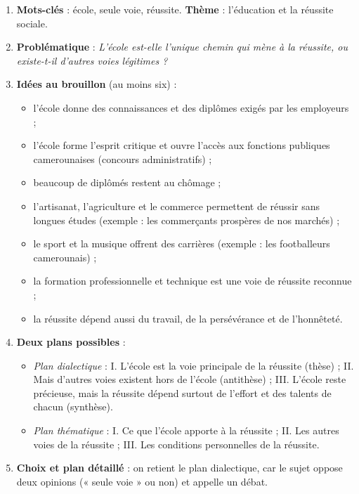 \documentclass[11pt]{article}
\newcommand{\cle}[1]{{\popxbold\color{popdark}#1}}
\begin{document}
\begin{corrige}
\begin{enumerate}
\item \textbf{Mots-clés} : \cle{école}, \cle{seule voie}, \cle{réussite}. \textbf{Thème} : l'éducation et la réussite sociale.
\item \textbf{Problématique} : \emph{L'école est-elle l'unique chemin qui mène à la réussite, ou existe-t-il d'autres voies légitimes ?}
\item \textbf{Idées au brouillon} (au moins six) :
\begin{itemize}
\item l'école donne des connaissances et des diplômes exigés par les employeurs ;
\item l'école forme l'esprit critique et ouvre l'accès aux fonctions publiques camerounaises (concours administratifs) ;
\item beaucoup de diplômés restent au chômage ;
\item l'artisanat, l'agriculture et le commerce permettent de réussir sans longues études (exemple : les commerçants prospères de nos marchés) ;
\item le sport et la musique offrent des carrières (exemple : les footballeurs camerounais) ;
\item la formation professionnelle et technique est une voie de réussite reconnue ;
\item la réussite dépend aussi du travail, de la persévérance et de l'honnêteté.
\end{itemize}
\item \textbf{Deux plans possibles} :
\begin{itemize}
\item \emph{Plan dialectique} : I. L'école est la voie principale de la réussite (thèse) ; II. Mais d'autres voies existent hors de l'école (antithèse) ; III. L'école reste précieuse, mais la réussite dépend surtout de l'effort et des talents de chacun (synthèse).
\item \emph{Plan thématique} : I. Ce que l'école apporte à la réussite ; II. Les autres voies de la réussite ; III. Les conditions personnelles de la réussite.
\end{itemize}
\item \textbf{Choix et plan détaillé} : on retient le plan dialectique, car le sujet oppose deux opinions (« seule voie » ou non) et appelle un débat.


\end{enumerate}
\end{corrige}
\end{document}

